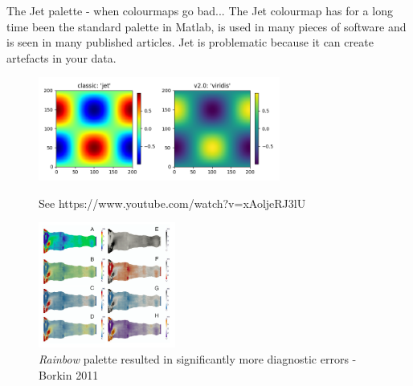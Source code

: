 \documentclass[9pt, aspectratio=169]{beamer}
\begin{document}
\begin{frame}
    {The Jet palette - when colourmaps go bad...}
    The Jet colourmap has for a long time been the standard palette in Matlab, is used in many pieces of software and is seen in many published articles. Jet is problematic because it can create artefacts in your data.

    \begin{figure}
        \centering
        {
            \includegraphics[width=300px]{jet_vs_viridis.png}
            \caption{\centering\color{gray}{Jet can create artefacts in the data. [Source: Matplotlib website]}
                See https://www.youtube.com/watch?v=xAoljeRJ3lU}
        }
        {
            \includegraphics[width=170px]{borkin2011.png}
            \caption{\centering\color{gray}
                {\textit{Rainbow} palette resulted in significantly more diagnostic errors - Borkin 2011}}
        }
    \end{figure}
\end{frame}
\end{document}
